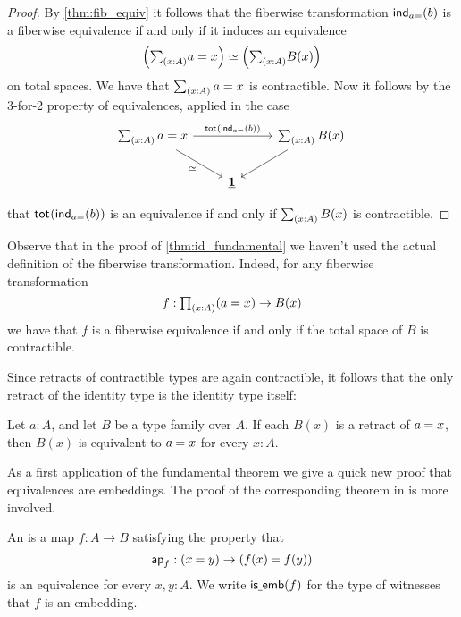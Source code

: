 \begin{proof}
By \autoref{thm:fib_equiv} it follows that the fiberwise transformation $\mathsf{ind}_{a{=}}(b)$ is a fiberwise equivalence if and only if it induces an equivalence
\begin{equation*}
\eqv{\Big(\sm{x:A}a=x\Big)}{\Big(\sm{x:A}B(x)\Big)}
\end{equation*}
on total spaces. We have that $\sm{x:A}a=x$ is contractible. Now it follows by the 3-for-2 property of equivalences, applied in the case
\begin{equation*}
\begin{tikzcd}
\sm{x:A}a=x \arrow[rr,"\total{\ind{a{=}}(b)}"] \arrow[dr,swap,"\eqvsym"] & & \sm{x:A}B(x) \arrow[dl] \\
& \unit & \phantom{\sm{x:A}a=x}
\end{tikzcd}
\end{equation*}
that $\mathsf{tot}_{}(\mathsf{ind}_{a{=}}(b))$ is an equivalence if and only if $\sm{x:A}B(x)$ is contractible.
\end{proof}

Observe that in the proof of \cref{thm:id_fundamental} we haven't used the actual definition of the fiberwise transformation. Indeed, for any fiberwise transformation
\begin{equation*}
f:\prd{x:A}(a=x)\to B(x)
\end{equation*}
we have that $f$ is a fiberwise equivalence if and only if the total space of $B$ is contractible.

Since retracts of contractible types are again contractible, it follows that the only retract of the identity type is the identity type itself:

\begin{cor}
Let $a:A$, and let $B$ be a type family over $A$. If each $B(x)$ is a retract of $\id{a}{x}$, then $B(x)$ is equivalent to $\id{a}{x}$ for every $x:A$.
\end{cor}

As a first application of the fundamental theorem we give a quick new proof that equivalences are embeddings. The proof of the corresponding theorem in \cite{hottbook} is more involved.

\begin{defn}
An  is a map $f:A\to B$ satisfying the property that
\begin{equation*}
\apfunc{f}:(\id{x}{y})\to(\id{f(x)}{f(y)})
\end{equation*}
is an equivalence for every $x,y:A$. We write $\mathsf{is\underline{\ }{}emb}(f)$ for the type of witnesses that $f$ is an embedding.
\end{defn}

